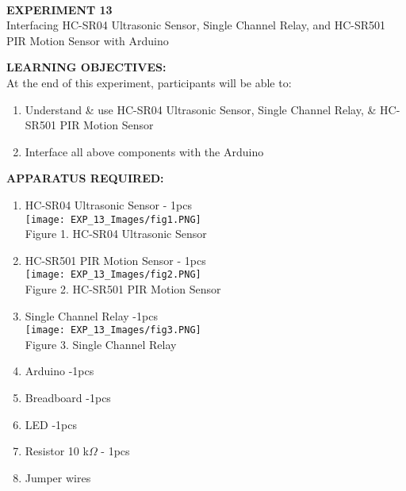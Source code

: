 \documentclass[12pt,a4paper]{article}
\begin{document}
\begin{center}

\textbf{\large \\EXPERIMENT 13 }\\[6pt]
Interfacing HC-SR04 Ultrasonic Sensor,
Single Channel Relay, and HC-SR501 PIR Motion Sensor with Arduino
\end{center}

\textbf{\large LEARNING OBJECTIVES:}\\[3pt]
At the end of this experiment, participants will be able to:\vspace{-6mm}\begin{enumerate}
 \setlength\itemsep{-0.3em}
\item Understand \& use HC-SR04 Ultrasonic Sensor, Single Channel Relay, \& HC-SR501 PIR Motion Sensor
\item Interface all above components with the Arduino
\end{enumerate}
\textbf{\large APPARATUS REQUIRED:}\\
\vspace{-0.1mm}
\begin{enumerate}
 \setlength\itemsep{-0.1em}
\item HC-SR04 Ultrasonic Sensor - 1pcs \\[3pt]
\texttt{[image: EXP\_13\_Images/fig1.PNG]}\\[3pt]
Figure 1. HC-SR04 Ultrasonic Sensor

\item HC-SR501 PIR Motion Sensor - 1pcs\\[3pt]
\texttt{[image: EXP\_13\_Images/fig2.PNG]}\\[3pt]
Figure 2. HC-SR501 PIR Motion Sensor

\item Single Channel Relay -1pcs\\[3pt]
\texttt{[image: EXP\_13\_Images/fig3.PNG]}\\[3pt]
Figure 3. Single Channel Relay
\vspace{1cm}
\item Arduino  -1pcs\\
\item Breadboard -1pcs\\
\item LED -1pcs\\
\item Resistor 10 k$\Omega$ - 1pcs\\ 
\item Jumper wires\\
\end{enumerate}
\end{document}
